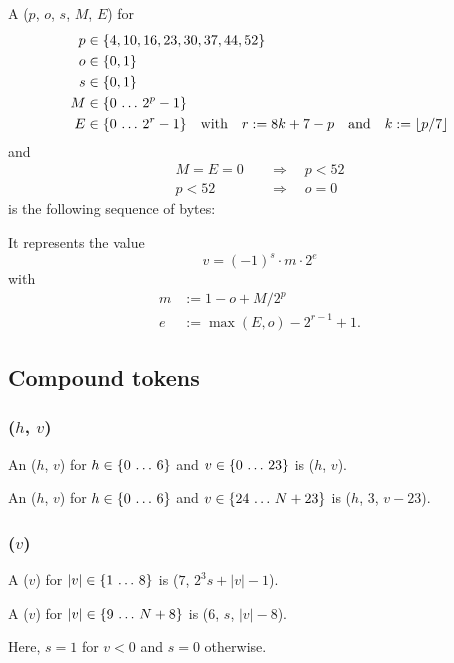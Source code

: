 A ($p$, $o$, $s$, $M$, $E$) for
\begin{align*}
    p & \in \{4, 10, 16, 23, 30, 37, 44, 52\} \\
    o & \in \{0, 1\} \\
    s & \in \{0, 1\} \\
    M & \in \{0 \,\ldots\, 2^p - 1\} \\
    E & \in \{0 \,\ldots\, 2^r - 1\}
        \quad\text{with}\quad r := 8 k + 7 - p
        \quad\text{and}\quad k := \lfloor p / 7 \rfloor
\end{align*}%
and
\begin{align*}
    M = E = 0 \quad & \Rightarrow \quad p < 52 \\
    p < 52 \quad & \Rightarrow \quad o = 0
\end{align*}%
is the following sequence of bytes:


It represents the value
\begin{equation}
    v = (-1)^s \cdot m \cdot 2^e
\end{equation}
with
\begin{align*}
    m & := 1 - o + M / 2^p \\
    e & := \max(E, o) - 2^{r-1} + 1.
\end{align*}


\subsection{Compound tokens}

\subsubsection{($h$, $v$)}
\hypertarget{sec:def:IntegerToken}{}

An ($h$, $v$) for $h \in \{0 \,\ldots\, 6\}$ and
$v \in \{0 \,\ldots\, 23\}$ is ($h$, $v$).

An ($h$, $v$) for $h \in \{0 \,\ldots\, 6\}$ and
$v \in \{24 \,\ldots\, N + 23\}$
is ($h$, $3$, $v - 23$).


\subsubsection{($v$)}
\hypertarget{sec:def:PowerOfTenToken}{}

A ($v$) for $|v| \in \{1 \,\ldots\, 8\}$ is
($7$, $2^3 s + |v| - 1$).

A ($v$) for $|v| \in \{9 \,\ldots\, N + 8\}$ is
($6$, $s$, $|v| - 8$).

Here, $s = 1$ for $v < 0$ and $s = 0$ otherwise.

